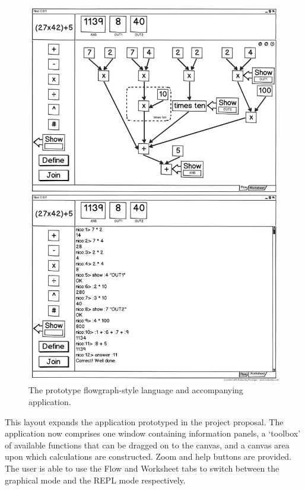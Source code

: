 \documentclass[12pt,twoside,notitlepage,xetex]{report}
\begin{document}
\begin{figure}[H]
\begin{center}
\includegraphics[width=\textwidth-4cm]{figs/mockups/flowgraph/img/fg-000.jpg}
\caption{The prototype flowgraph-style language and accompanying application.}
\label{fig:ProtoFlow}
\end{center}
\end{figure}

This layout expands the application prototyped in the project proposal.  The application now comprises one window containing information panels, a `toolbox' of available functions that can be dragged on to the canvas, and a canvas area upon which calculations are constructed.  Zoom and help buttons are provided.  The user is able to use the {\sfapp Flow} and {\sfapp Worksheet} tabs to switch between the graphical mode and the REPL mode respectively.
\end{document}
